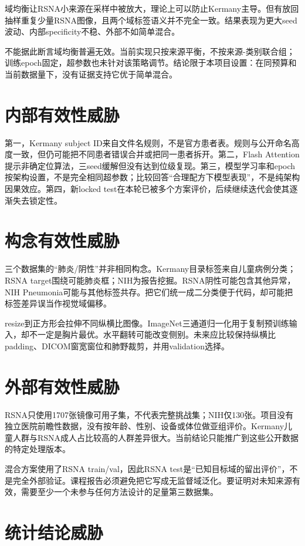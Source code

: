 域均衡让RSNA小来源在采样中被放大，理论上可以防止Kermany主导。但有放回抽样重复少量RSNA图像，且两个域标签语义并不完全一致。结果表现为更大seed波动、内部specificity不稳、外部不如简单混合。

不能据此断言域均衡普遍无效。当前实现只按来源平衡，不按来源-类别联合组；训练epoch固定，超参数也未针对该策略调节。结论限于本项目设置：在同预算和当前数据量下，没有证据支持它优于简单混合。

\section{内部有效性威胁}

第一，Kermany subject ID来自文件名规则，不是官方患者表。规则与公开命名高度一致，但仍可能把不同患者错误合并或把同一患者拆开。第二，Flash Attention提示非确定位算法，三seed缓解但没有达到位级复现。第三，模型学习率和epoch按架构设置，不是完全相同超参数；比较回答“合理配方下模型表现”，不是纯架构因果效应。第四，新locked test在本轮已被多个方案评价，后续继续迭代会使其逐渐失去锁定性。

\section{构念有效性威胁}

三个数据集的“肺炎/阴性”并非相同构念。Kermany目录标签来自儿童病例分类；RSNA target围绕可能肺炎框；NIH为报告挖掘。RSNA阴性可能包含其他异常，NIH Pneumonia可能与其他标签共存。把它们统一成二分类便于代码，却可能把标签差异误当作视觉域偏移。

resize到正方形会拉伸不同纵横比图像。ImageNet三通道归一化用于复制预训练输入，却不一定是胸片最优。水平翻转可能改变侧别。未来应比较保持纵横比padding、DICOM窗宽窗位和肺野裁剪，并用validation选择。

\section{外部有效性威胁}

RSNA只使用1707张镜像可用子集，不代表完整挑战集；NIH仅130张。项目没有独立医院前瞻性数据，没有按年龄、性别、设备或体位做亚组评价。Kermany儿童人群与RSNA成人占比较高的人群差异很大。当前结论只能推广到这些公开数据的特定处理版本。

混合方案使用了RSNA train/val，因此RSNA test是“已知目标域的留出评价”，不是完全外部验证。课程报告必须避免把它写成无监督域泛化。要证明对未知来源有效，需要至少一个未参与任何方法设计的足量第三数据集。

\section{统计结论威胁}

